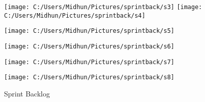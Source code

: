 \documentclass{beamer}
\begin{document}
\begin{frame}
	
	\begin{figure}[bph]
		\centering
		\texttt{[image: C:/Users/Midhun/Pictures/sprintback/s3]}
		\texttt{[image: C:/Users/Midhun/Pictures/sprintback/s4]}
		
	\end{figure}
	
	\pagebreak
	\begin{figure}[bph]
		\centering
		\texttt{[image: C:/Users/Midhun/Pictures/sprintback/s5]}
		
		
	\end{figure}
\end{frame}
\begin{frame}

	\pagebreak
	\begin{figure}[bph]
		\centering
		\texttt{[image: C:/Users/Midhun/Pictures/sprintback/s6]}
		
		
	\end{figure}
	\pagebreak
	\begin{figure}[bph]
		\centering
		\texttt{[image: C:/Users/Midhun/Pictures/sprintback/s7]}
		
		
	\end{figure}
	\pagebreak
\end{frame}	
	
	\begin{frame}
		
	
	\begin{figure}[bph]
		\centering
		\texttt{[image: C:/Users/Midhun/Pictures/sprintback/s8]}
		
		
		\caption{Sprint Backlog}
		
	\end{figure}
	
\end{frame}	
\end{document}
